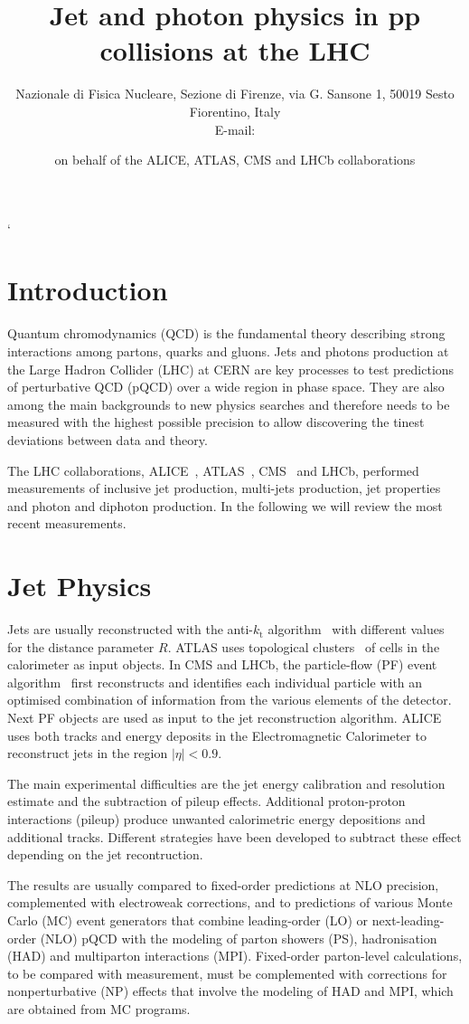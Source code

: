 \documentclass{PoS}
\title{Jet and photon physics in pp collisions at the LHC}
\author{\speaker{ Vitaliano Ciulli }%
Nazionale di Fisica Nucleare, Sezione di Firenze, via G. Sansone 1, 50019 Sesto Fiorentino, Italy \\ E-mail:
\email{vitaliano.ciulli@fi.infn.it}} \author{on behalf of the ALICE, ATLAS, CMS and LHCb collaborations}
\providecommand{\kts}{\ensuremath{k_{\mathrm{t}}}\xspace}
\begin{document}
`
\section{Introduction}

Quantum chromodynamics (QCD) is the fundamental theory describing strong interactions among partons, \ie quarks and
gluons. Jets and photons production at the Large Hadron Collider (LHC) at CERN are key processes to test predictions of
perturbative QCD (pQCD) over a wide region in phase space. They are also among the main backgrounds to new physics
searches and therefore needs to be measured with the highest possible precision to allow discovering the tinest
deviations between data and theory.

The LHC collaborations, ALICE~, ATLAS~\cite{Aad:2008zzm}, CMS~\cite{Chatrchyan:2008aa} and LHCb, performed
measurements of inclusive jet production, multi-jets production, jet properties and photon and diphoton production. 
In the following we will review the most recent measurements.

\section{Jet Physics}

Jets are usually reconstructed with the anti-\kts algorithm~\cite{Cacciari:2008gp} with different values for the distance parameter $R$.
ATLAS uses topological clusters~\cite{Lampl:2008zz} of cells in the calorimeter as input objects. 
In CMS and LHCb, the particle-flow (PF) event algorithm~\cite{CMS:2009nxa}
first reconstructs and identifies each individual particle with an optimised
combination of information from the various elements of the detector. Next PF objects are used as input to the jet
reconstruction algorithm. ALICE uses both tracks and energy deposits in the
Electromagnetic Calorimeter to reconstruct jets in the region $|\eta|<0.9$.

The main experimental difficulties are the jet energy calibration and resolution estimate and the subtraction of pileup
effects. Additional proton-proton interactions (pileup) produce unwanted calorimetric energy depositions and additional
tracks. Different strategies have been developed to subtract these effect depending on the jet recontruction.

The results are usually compared to fixed-order predictions at NLO precision, complemented with electroweak corrections, and to predictions of
various Monte Carlo (MC) event generators that combine leading-order (LO) or next-leading-order (NLO) pQCD with the modeling of parton
showers (PS), hadronisation (HAD) and multiparton interactions (MPI).
Fixed-order parton-level calculations, to be compared with measurement, must be complemented with corrections for nonperturbative
(NP) effects that involve the modeling of HAD and MPI, which are obtained from MC programs. 
\end{document}
